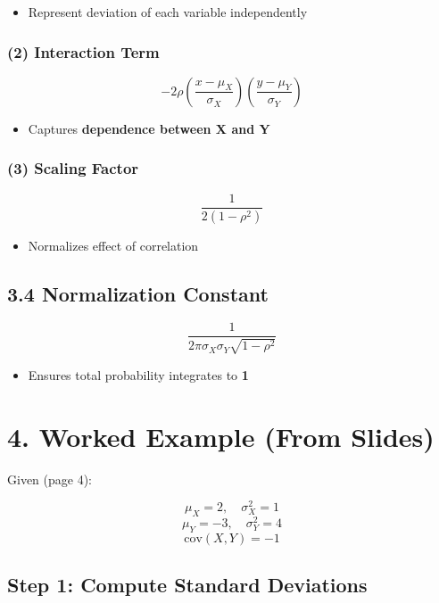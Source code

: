 \documentclass[11pt]{article}
\begin{document}
\begin{itemize}
\item Represent deviation of each variable independently
\end{itemize}

\subsubsection*{(2) Interaction Term}

\[
-2\rho
\left(\frac{x - \mu_X}{\sigma_X}\right)
\left(\frac{y - \mu_Y}{\sigma_Y}\right)
\]

\begin{itemize}
\item Captures \textbf{dependence between X and Y}
\end{itemize}

\subsubsection*{(3) Scaling Factor}

\[
\frac{1}{2(1 - \rho^2)}
\]

\begin{itemize}
\item Normalizes effect of correlation
\end{itemize}

\subsection*{3.4 Normalization Constant}

\[
\frac{1}{2\pi \sigma_X \sigma_Y \sqrt{1 - \rho^2}}
\]

\begin{itemize}
\item Ensures total probability integrates to \textbf{1}
\end{itemize}

\section*{4. Worked Example (From Slides)}

Given (page 4):

\[
\mu_X = 2, \quad \sigma_X^2 = 1
\]
\[
\mu_Y = -3, \quad \sigma_Y^2 = 4
\]
\[
\text{cov}(X,Y) = -1
\]

\subsection*{Step 1: Compute Standard Deviations}
\end{document}
